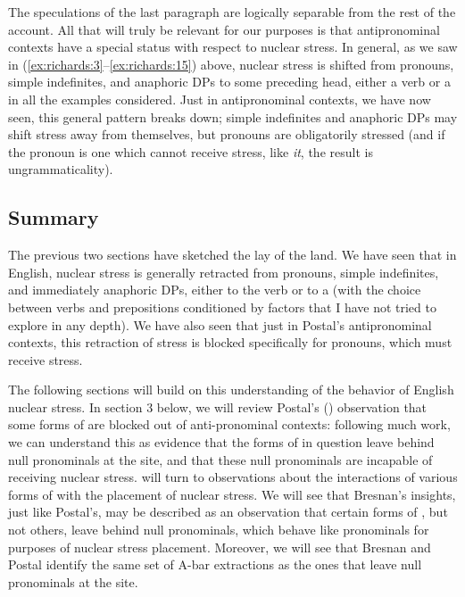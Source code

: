 \documentclass[output=paper]{LSP/langsci}
\begin{document}
  The speculations of the last paragraph are logically separable from the rest of the account.  All that will truly be relevant for our purposes is that antipronominal contexts have a special status with respect to nuclear stress.  In general, as we saw in (\ref{ex:richards:3}--\ref{ex:richards:15}) above, nuclear stress is shifted from pronouns, simple indefinites, and anaphoric DPs to some preceding head, either a verb or a  in all the examples considered.  Just in antipronominal contexts, we have now seen, this general pattern breaks down; simple indefinites and anaphoric DPs may shift stress away from themselves, but pronouns are obligatorily stressed (and if the pronoun is one which cannot receive stress, like \textit{it}, the result is ungrammaticality).

\subsection{Summary}

The previous two sections have sketched the lay of the land.  We have seen that in English, nuclear stress is generally retracted from pronouns, simple indefinites, and immediately anaphoric DPs, either to the verb or to a  (with the choice between verbs and prepositions conditioned by factors that I have not tried to explore in any depth).  We have also seen that just in Postal’s antipronominal contexts, this retraction of stress is blocked specifically for pronouns, which must receive stress.

  The following sections will build on this understanding of the behavior of English nuclear stress.  In section 3 below, we will review Postal’s (\citeyear{Postal1994,Postal1998,Postal2001}) observation that some forms of  are blocked out of anti-pronominal contexts: following much work, we can understand this as evidence that the forms of  in {question} leave behind null pronominals at the  site, and that these null pronominals are incapable of receiving nuclear stress.   will turn to  observations about the interactions of various forms of  with the placement of nuclear stress.  We will see that Bresnan’s insights, just like Postal’s, may be described as an observation that certain forms of , but not others, leave behind null pronominals, which behave like pronominals for purposes of nuclear stress placement.  Moreover, we will see that Bresnan and Postal identify the same set of A-bar extractions as the ones that leave null pronominals at the  site. 
\end{document}

